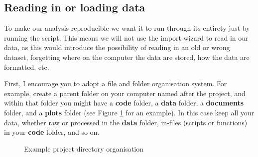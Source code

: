 \documentclass[12pt,a4paper]{article}
\begin{document}
\subsection{Reading in or loading data}
To make our analysis reproducible we want it to run through its entirety just by running the script.
This means we will not use the import wizard to read in our data, as this would introduce the possibility of reading in an old or wrong dataset, forgetting where on the computer the data are stored, how the data are formatted, etc.

First, I encourage you to adopt a file and folder organisation system.
For example, create a parent folder on your computer named after the project, and within that folder you might have a \textbf{code} folder, a \textbf{data} folder, a \textbf{documents} folder, and a \textbf{plots} folder (see Figure \ref{fig:folders} for an example).
In this case keep all your data, whether raw or processed in the \textbf{data} folder, m-files (scripts or functions) in your \textbf{code} folder, and so on.
\begin{figure}

\caption{Example project directory organisation}
\label{fig:folders}
\end{figure}
\end{document}
